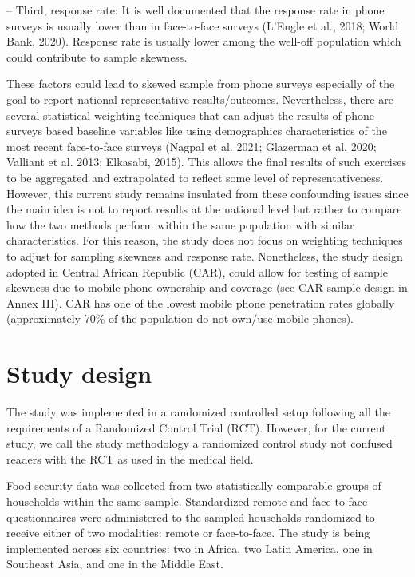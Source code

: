 \documentclass[11pt,harvard]{article}
\begin{document}
–	Third, response rate: It is well documented that the response rate in phone surveys is usually lower than in face-to-face surveys (L’Engle et al., 2018; World Bank, 2020). Response rate is usually lower among the well-off population which could contribute to sample skewness.
 
These factors could lead to skewed sample from phone surveys especially of the goal to report national representative results/outcomes. Nevertheless, there are several statistical weighting techniques that can adjust the results of phone surveys based baseline variables like using demographics characteristics of the most recent face-to-face surveys (Nagpal et al. 2021; Glazerman et al. 2020; Valliant et al. 2013; Elkasabi, 2015). This allows the final results of such exercises to be aggregated and extrapolated to reflect some level of representativeness. However, this current study remains insulated from these confounding issues since the main idea is not to report results at the national level but rather to compare how the two methods perform within the same population with similar characteristics. For this reason, the study does not focus on weighting techniques to adjust for sampling skewness and response rate. Nonetheless, the study design adopted in Central African Republic (CAR), could allow for testing of sample skewness due to mobile phone ownership and coverage (see CAR sample design in Annex III). CAR has one of the lowest mobile phone penetration rates globally (approximately 70\% of the population do not own/use mobile phones).

\pagebreak


\section{Study design}

The study was implemented in a randomized controlled setup following all the requirements of a Randomized Control Trial (RCT). However, for the current study, we call the study methodology a randomized control study not confused readers with the RCT as used in the medical field. 

Food security data was collected from two statistically comparable groups of households within the same sample. Standardized remote and face-to-face questionnaires were administered to the sampled households randomized to receive either of two modalities: remote or face-to-face. The study is being implemented across six countries: two in Africa, two Latin America, one in Southeast Asia, and one in the Middle East.
\end{document}
